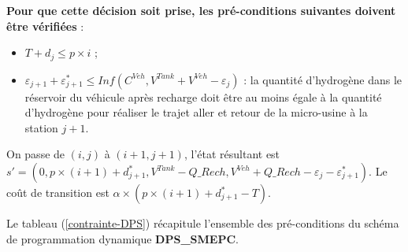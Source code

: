 \begin{enumerate}
	\textbf{Pour que cette décision soit prise, les pré-conditions suivantes doivent être vérifiées} :
	
	\begin{itemize}[label=$\square$]
		\item $T+d_j\leq p \times i$ ;
		\item $\varepsilon_{j+1} + \varepsilon^*_{j+1} \leq Inf(C^{Veh}, V^{Tank}+V^{Veh}-\varepsilon_j)$ : la quantité d'hydrogène dans le réservoir du véhicule après recharge doit être au moins égale à la quantité d'hydrogène pour réaliser le trajet aller et retour de la micro-usine à la station $j+1$.
	\end{itemize}
	
	On passe de $(i,j)$ à $(i+1,j+1)$, l'état résultant est $s'= (0, p\times (i + 1) + d^*_{j + 1}, V^{Tank}-Q\_Rech, V^{Veh} +Q\_Rech -\varepsilon_j-\varepsilon_{j+1}^*)$. Le coût de transition est $\alpha \times (p \times(i+1)+d^*_{j+1}-T)$.
	
	
\end{enumerate}

Le tableau (\ref{contrainte-DPS}) récapitule l'ensemble des pré-conditions du schéma de programmation dynamique \textbf{DPS\_SMEPC}.

